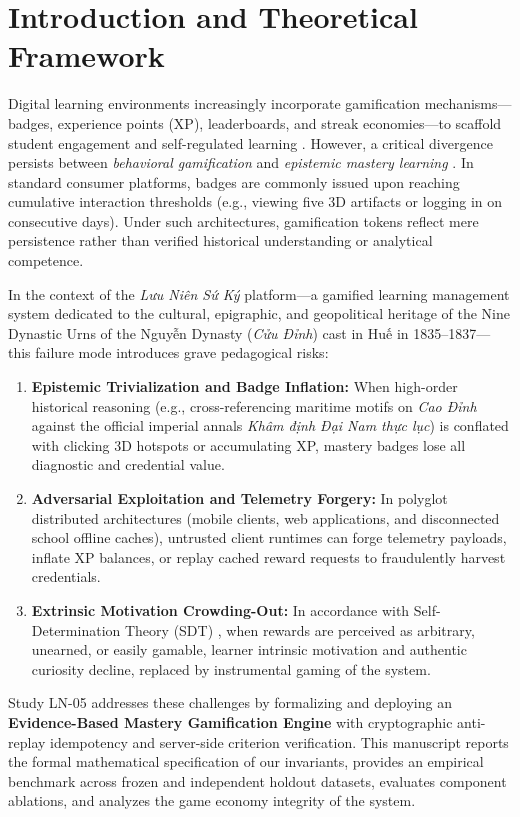 \documentclass[11pt,a4paper]{article}
\begin{document}
\section{Introduction and Theoretical Framework}

Digital learning environments increasingly incorporate gamification mechanisms—badges, experience points (XP), leaderboards, and streak economies—to scaffold student engagement and self-regulated learning \cite{deterding2011game, hamari2014does}. However, a critical divergence persists between \textit{behavioral gamification} and \textit{epistemic mastery learning} \cite{bloom1968mastery}. In standard consumer platforms, badges are commonly issued upon reaching cumulative interaction thresholds (e.g., viewing five 3D artifacts or logging in on consecutive days). Under such architectures, gamification tokens reflect mere persistence rather than verified historical understanding or analytical competence.

In the context of the \textit{Lưu Niên Sứ Ký} platform—a gamified learning management system dedicated to the cultural, epigraphic, and geopolitical heritage of the Nine Dynastic Urns of the Nguyễn Dynasty (\textit{Cửu Đỉnh}) cast in Huế in 1835–1837—this failure mode introduces grave pedagogical risks:
\begin{enumerate}[leftmargin=*]
    \item \textbf{Epistemic Trivialization and Badge Inflation:} When high-order historical reasoning (e.g., cross-referencing maritime motifs on \textit{Cao Đỉnh} against the official imperial annals \textit{Khâm định Đại Nam thực lục}) is conflated with clicking 3D hotspots or accumulating XP, mastery badges lose all diagnostic and credential value.
    \item \textbf{Adversarial Exploitation and Telemetry Forgery:} In polyglot distributed architectures (mobile clients, web applications, and disconnected school offline caches), untrusted client runtimes can forge telemetry payloads, inflate XP balances, or replay cached reward requests to fraudulently harvest credentials.
    \item \textbf{Extrinsic Motivation Crowding-Out:} In accordance with Self-Determination Theory (SDT) \cite{ryan2000self}, when rewards are perceived as arbitrary, unearned, or easily gamable, learner intrinsic motivation and authentic curiosity decline, replaced by instrumental gaming of the system.
\end{enumerate}

Study LN-05 addresses these challenges by formalizing and deploying an \textbf{Evidence-Based Mastery Gamification Engine} with cryptographic anti-replay idempotency and server-side criterion verification. This manuscript reports the formal mathematical specification of our invariants, provides an empirical benchmark across frozen and independent holdout datasets, evaluates component ablations, and analyzes the game economy integrity of the system.
\end{document}
